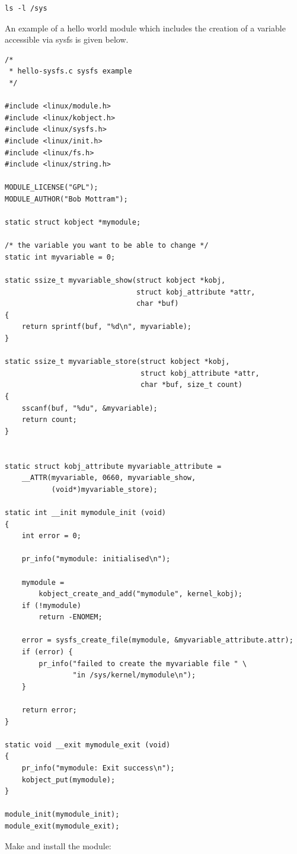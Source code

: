 \documentclass[11pt]{article}
\begin{document}
\begin{verbatim}
ls -l /sys
\end{verbatim}

An example of a hello world module which includes the creation of a variable accessible via sysfs is given below.

\begin{verbatim}
/*
 * hello-sysfs.c sysfs example
 */

#include <linux/module.h>
#include <linux/kobject.h>
#include <linux/sysfs.h>
#include <linux/init.h>
#include <linux/fs.h>
#include <linux/string.h>

MODULE_LICENSE("GPL");
MODULE_AUTHOR("Bob Mottram");

static struct kobject *mymodule;

/* the variable you want to be able to change */
static int myvariable = 0;

static ssize_t myvariable_show(struct kobject *kobj,
                               struct kobj_attribute *attr,
                               char *buf)
{
    return sprintf(buf, "%d\n", myvariable);
}

static ssize_t myvariable_store(struct kobject *kobj,
                                struct kobj_attribute *attr,
                                char *buf, size_t count)
{
    sscanf(buf, "%du", &myvariable);
    return count;
}


static struct kobj_attribute myvariable_attribute =
    __ATTR(myvariable, 0660, myvariable_show,
           (void*)myvariable_store);

static int __init mymodule_init (void)
{
    int error = 0;

    pr_info("mymodule: initialised\n");

    mymodule =
        kobject_create_and_add("mymodule", kernel_kobj);
    if (!mymodule)
        return -ENOMEM;

    error = sysfs_create_file(mymodule, &myvariable_attribute.attr);
    if (error) {
        pr_info("failed to create the myvariable file " \
                "in /sys/kernel/mymodule\n");
    }

    return error;
}

static void __exit mymodule_exit (void)
{
    pr_info("mymodule: Exit success\n");
    kobject_put(mymodule);
}

module_init(mymodule_init);
module_exit(mymodule_exit);
\end{verbatim}

Make and install the module:
\end{document}
